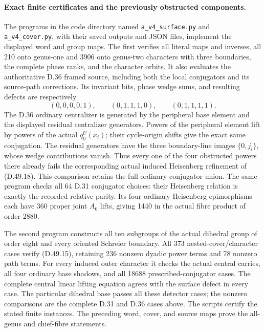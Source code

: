 \paragraph{Exact finite certificates and the previously obstructed components.}
The programs in the code directory named
\texttt{a\_v4\_surface.py} and \texttt{a\_v4\_cover.py}, with their
saved outputs and JSON files, implement the displayed word and group
maps. The first verifies all literal maps and inverses, all 210 onto
genus-one and 3906 onto genus-two characters with three boundaries,
the complete phase ranks, and the character orbits. It also evaluates
the authoritative D.36 framed source, including both the local
conjugators and its source-path corrections. Its invariant bits,
phase wedge sums, and resulting defects are respectively
\[
 (0,0,0,0,1),\qquad (0,1,1,1,0),\qquad (0,1,1,1,1).
 \tag{D.49.28}
\]
The D.36 ordinary centralizer is generated by the peripheral base
element and the displayed residual centralizer generators.
Powers of the peripheral element lift by powers of the actual
\(q^U_0(x_i)\); their cycle-origin shifts give the exact same
conjugation. The residual generators have the three boundary-line
images \(\{0,j_i\}\), whose wedge contributions vanish.
Thus every one of the four obstructed powers there already fails
the corresponding actual induced Heisenberg refinement of
\textup{(D.49.18)}. This comparison retains the full ordinary
conjugator union.
The same program checks all 64 D.31 conjugator choices: their
Heisenberg relation is exactly the recorded relative parity.
Its four ordinary Heisenberg epimorphisms each have 360 proper
joint \(A_6\) lifts, giving 1440 in the actual fibre product of
order 2880.

The second program constructs all ten subgroups of the actual
dihedral group of order eight and every oriented Schreier boundary.
All 373 nested-cover/character cases verify
\textup{(D.49.15)}, retaining 236 nonzero dyadic power terms and
78 nonzero path terms. For every induced outer character it checks
the actual central carries, all four ordinary base shadows, and all
18688 prescribed-conjugator cases. The complete central linear
lifting equation agrees with the surface defect in every case.
The particular dihedral base passes all these detector cases; the
nonzero comparisons are the complete D.31 and D.36 cases above.
The scripts certify the stated finite instances. The preceding
word, cover, and source maps prove the all-genus and chief-fibre
statements.
